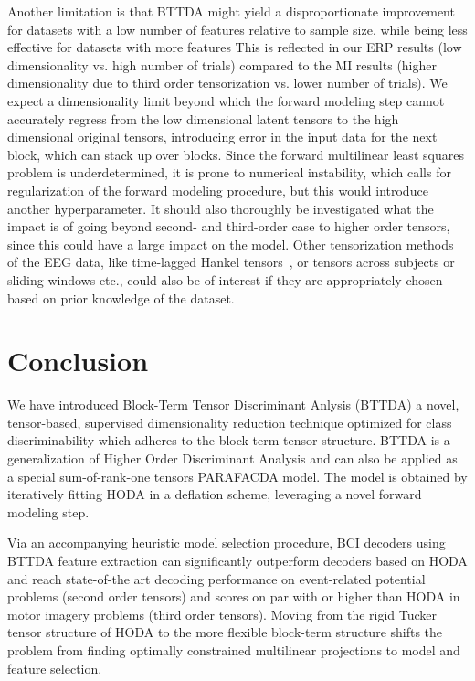 Another limitation is that BTTDA might yield a disproportionate
improvement for datasets with a low number of features relative to sample size,
while being less effective for datasets with more features
This is reflected
in our ERP results (low dimensionality vs. high number of trials) compared to the
MI results (higher dimensionality due to third order tensorization vs. lower
number of trials).
We expect a dimensionality limit beyond which the forward modeling step cannot
accurately regress from the low dimensional latent tensors to the high
dimensional original tensors, introducing
error in the input data for the next block, which can stack up over blocks.
Since the forward multilinear least squares problem is underdetermined, it is prone to
numerical instability, which calls for regularization of the forward modeling
procedure, but this would introduce another hyperparameter.
It should also thoroughly be investigated what the impact is of going beyond
second- and third-order case to higher order tensors, since this could have a large impact
on the model.
Other tensorization methods of the EEG data, like time-lagged Hankel
tensors~\cite{Papy2005}, or tensors across subjects or sliding windows etc., could also be
of interest if they are appropriately chosen based on prior knowledge of the dataset.

\section{Conclusion}

We have introduced Block-Term Tensor Discriminant Anlysis (BTTDA) a novel,
tensor-based, supervised dimensionality reduction technique optimized for class
discriminability which adheres to the block-term tensor structure.
BTTDA is a generalization of Higher Order Discriminant Analysis and can also be
applied as a special sum-of-rank-one tensors PARAFACDA model.
The model is obtained by iteratively fitting HODA in a deflation scheme,
leveraging a novel forward modeling step.

Via an accompanying heuristic model selection procedure, BCI decoders using BTTDA
feature extraction can significantly outperform decoders based on HODA and
reach state-of-the art decoding performance on event-related potential
problems (second order tensors) and scores on par with or higher than HODA  in motor
imagery problems (third order tensors).
Moving from the rigid Tucker tensor structure of HODA to the more flexible
block-term structure shifts the problem from finding optimally constrained multilinear
projections to model and feature selection.

